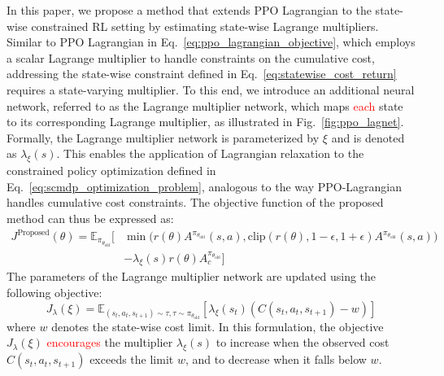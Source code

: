 In this paper, we propose a method that extends PPO Lagrangian to the state-wise constrained RL setting by estimating state-wise Lagrange multipliers.
Similar to PPO Lagrangian in Eq.~\eqref{eq:ppo_lagrangian_objective}, which employs a scalar Lagrange multiplier to handle constraints on the cumulative cost, addressing the state-wise constraint defined in Eq.~\eqref{eq:statewise_cost_return} requires a state-varying multiplier.
To this end, we introduce an additional neural network, referred to as the Lagrange multiplier network, which maps \textcolor{red}{each} state to its corresponding Lagrange multiplier, as illustrated in Fig.~\ref{fig:ppo_lagnet}.
Formally, the Lagrange multiplier network is parameterized by $\xi$ and is denoted as $\lambda_\xi(s)$.
This enables the application of Lagrangian relaxation to the constrained policy optimization defined in Eq.~\eqref{eq:scmdp_optimization_problem}, analogous to the way PPO-Lagrangian handles cumulative cost constraints.
The objective function of the proposed method can thus be expressed as:
\begin{equation} 
    \begin{aligned} J^{\text{Proposed}}(\theta) 
        = \mathbb{E}_{\pi_{\theta_\text{old}}} \Big[ &\min \big( r(\theta) A^{\pi_{\theta_\text{old}}}(s, a), \text{clip}(r(\theta), 1 - \epsilon, 1 + \epsilon) A^{\pi_{\theta_\text{old}}}(s, a) \big) 
        \\ &- \lambda_\xi(s) r(\theta) A^{\pi_{\theta_\text{old}}}_c \Big] 
    \end{aligned} 
\end{equation}
The parameters of the Lagrange multiplier network are updated using the following objective:
\begin{equation} \label{eq:lagrange_multiplier_update}
    J_\lambda(\xi) = \mathbb{E}_{(s_t, a_t, s_{t + 1}) \sim \tau, \tau \sim \pi_{\theta_\text{old}}} [\lambda_\xi(s_t) (C(s_t, a_t, s_{t + 1}) - w)]
\end{equation}
where $w$ denotes the state-wise cost limit.  %
In this formulation, the objective $J_\lambda(\xi)$ \textcolor{red}{encourages} the multiplier $\lambda_\xi(s)$ to increase when the observed cost $C(s_t, a_t, s_{t+1})$ exceeds the limit $w$, and to decrease when it falls below $w$.
